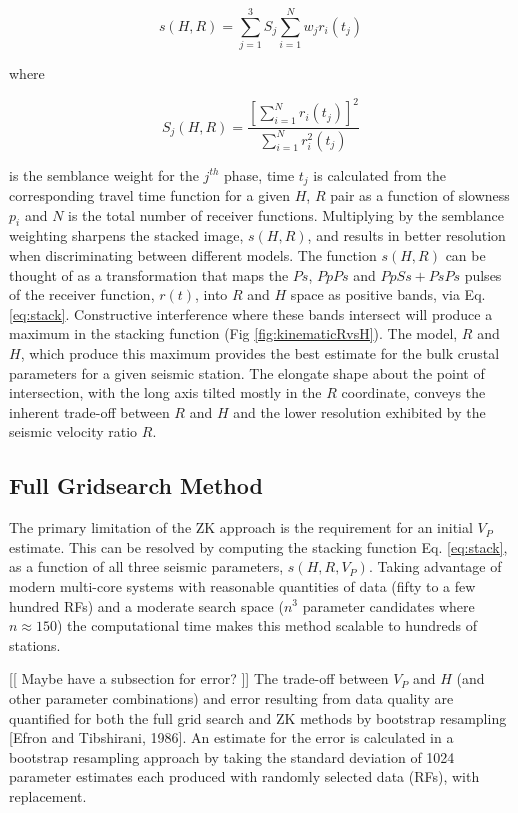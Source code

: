 \documentclass[draft, 12pt]{article}
\begin{document}
\begin{equation}  \label{eq:stack}
s(H,R) = \sum_{j=1}^{3} S_j \sum_{i=1}^N w_jr_i(t_j)
\end{equation}

where

\begin{equation}
S_j(H,R) = \frac {\left[ \sum_{i=1}^N r_i(t_j) \right]^2}
                 { \sum_{i=1}^N r_i^2(t_j) }
\end{equation}

is the semblance weight for the $j^{th}$ phase, time $t_j$ is calculated from the corresponding travel time function for a given $H$, $R$ pair as a function of slowness $p_i$ and $N$ is the total number of receiver functions. Multiplying by the semblance weighting sharpens the stacked image, $s(H,R)$, and results in better resolution when discriminating between different models. The function $s(H,R)$ can be thought of as a transformation that maps the $Ps$, $PpPs$ and $PpSs+PsPs$ pulses of the receiver function, $r(t)$, into $R$ and $H$ space as positive bands, via Eq. \ref{eq:stack}. Constructive interference where these bands intersect will produce a maximum in the stacking function (Fig \ref{fig:kinematicRvsH}). The model, $R$ and $H$, which produce this maximum provides the best estimate for the bulk crustal parameters for a given seismic station. The elongate shape about the point of intersection, with the long axis tilted mostly in the $R$ coordinate, conveys the inherent trade-off between $R$ and $H$ and the lower resolution exhibited by the seismic velocity ratio $R$.


\subsection{Full Gridsearch Method}
The primary limitation of the ZK approach is the requirement for an initial $V_P$ estimate. This can be resolved by computing the stacking function Eq. \ref{eq:stack}, as a function of all three seismic parameters, $s(H,R,V_P)$. Taking advantage of modern multi-core systems with reasonable quantities of data (fifty to a few hundred RFs) and a moderate search space ($n^3$ parameter candidates where $n \approx 150$) the computational time makes this method scalable to hundreds of stations.

[[ Maybe have a subsection for error? ]]
 The trade-off between $V_P$ and $H$ (and other parameter combinations) and error resulting from data quality are quantified for both the full grid search and ZK methods by bootstrap resampling [Efron and Tibshirani, 1986]. An estimate for the error is calculated in a bootstrap resampling approach by taking the standard deviation of 1024 parameter estimates each produced with randomly selected data (RFs), with replacement.
\end{document}
